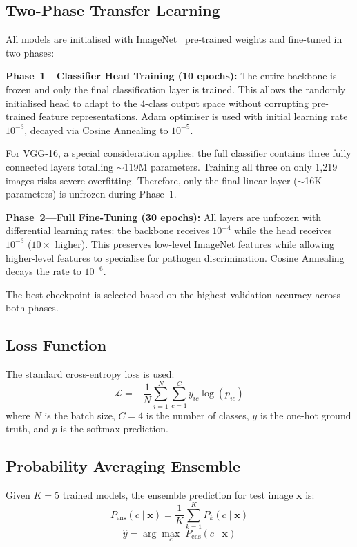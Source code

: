 \documentclass[conference]{IEEEtran}
\begin{document}
\subsection{Two-Phase Transfer Learning}

All models are initialised with ImageNet~\cite{deng2009imagenet} pre-trained weights and fine-tuned in two phases:

\textbf{Phase~1---Classifier Head Training (10 epochs):} The entire backbone is frozen and only the final classification layer is trained. This allows the randomly initialised head to adapt to the 4-class output space without corrupting pre-trained feature representations. Adam optimiser is used with initial learning rate $10^{-3}$, decayed via Cosine Annealing to $10^{-5}$.

For VGG-16, a special consideration applies: the full classifier contains three fully connected layers totalling $\sim$119M parameters. Training all three on only 1,219 images risks severe overfitting. Therefore, only the final linear layer ($\sim$16K parameters) is unfrozen during Phase~1.

\textbf{Phase~2---Full Fine-Tuning (30 epochs):} All layers are unfrozen with differential learning rates: the backbone receives $10^{-4}$ while the head receives $10^{-3}$ ($10\times$ higher). This preserves low-level ImageNet features while allowing higher-level features to specialise for pathogen discrimination. Cosine Annealing decays the rate to $10^{-6}$.

The best checkpoint is selected based on the highest validation accuracy across both phases.

\subsection{Loss Function}

The standard cross-entropy loss is used:
\begin{equation}
\mathcal{L} = -\frac{1}{N} \sum_{i=1}^{N} \sum_{c=1}^{C} y_{ic} \log(p_{ic})
\end{equation}
where $N$ is the batch size, $C = 4$ is the number of classes, $y$ is the one-hot ground truth, and $p$ is the softmax prediction.

\subsection{Probability Averaging Ensemble}

Given $K = 5$ trained models, the ensemble prediction for test image $\mathbf{x}$ is:
\begin{equation}
P_{\text{ens}}(c \mid \mathbf{x}) = \frac{1}{K} \sum_{k=1}^{K} P_k(c \mid \mathbf{x})
\end{equation}
\begin{equation}
\hat{y} = \arg\max_c \; P_{\text{ens}}(c \mid \mathbf{x})
\end{equation}
\end{document}

